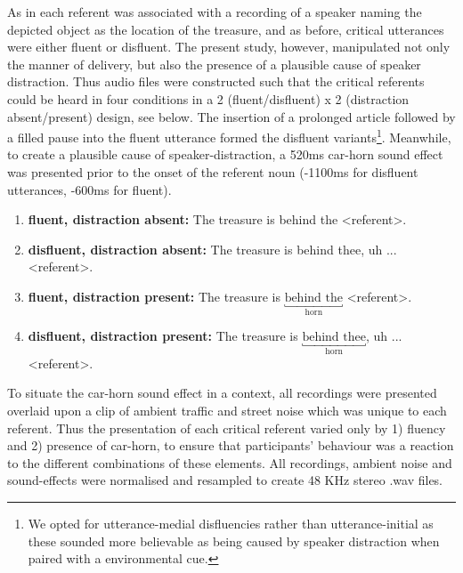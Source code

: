 \documentclass[man]{apa6}
\begin{document}
As in \citet{Loy2016} each referent was associated with a recording of a speaker naming the depicted object as the location of the treasure, and as before, critical utterances were either fluent or disfluent. 
The present study, however, manipulated not only the manner of delivery, but also the presence of a plausible cause of speaker distraction. 
Thus audio files were constructed such that the critical referents could be heard in four conditions in a 2 (fluent/disfluent) x 2 (distraction absent/present) design, see below. 
The insertion of a prolonged article followed by a filled pause into the fluent utterance formed the disfluent variants\footnote{We opted for utterance-medial disfluencies rather than utterance-initial as these sounded more believable as being caused by speaker distraction when paired with a environmental cue.}. 
Meanwhile, to create a plausible cause of speaker-distraction, a 520ms car-horn sound effect was presented prior to the onset of the referent noun (-1100ms for disfluent utterances, -600ms for fluent). 
\begin{enumerate}
\item \textbf{fluent, distraction absent:} The treasure is behind the \textless referent\textgreater .
\item \textbf{disfluent, distraction absent:} The treasure is behind thee, uh ... \textless referent\textgreater .
\item \textbf{fluent, distraction present:} The treasure is $\underbracket{\text{behind the}}_\text{horn}$ \textless referent\textgreater .
\item \textbf{disfluent, distraction present:} The treasure is $\underbracket{\text{behind thee}}_\text{horn}$, uh ...\textless referent\textgreater .
\end{enumerate}

To situate the car-horn sound effect in a context, all recordings were presented overlaid upon a clip of ambient traffic and street noise which was unique to each referent. 
Thus the presentation of each critical referent varied only by 1) fluency and 2) presence of car-horn, to ensure that participants' behaviour was a reaction to the different combinations of these elements. 
All recordings, ambient noise and sound-effects were normalised and resampled to create 48 KHz stereo .wav files.\\
\end{document}
